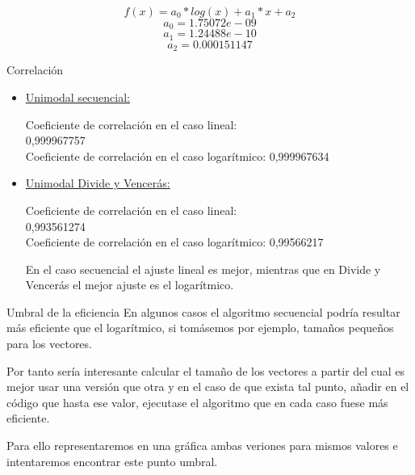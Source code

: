 \documentclass[12pt]{beamer}
\begin{document}
\begin{frame}
\[
f(x)=a_0*log(x)+a_1*x+a_2
\]
\[
a_0=1.75072e-09
\]
\[
a_1=1.24488e-10
\]
\[
a_2=0.000151147 
\]
\end{frame}

\begin{frame}{Correlación}
\begin{itemize}
\item \underline{Unimodal secuencial:}

	Coeficiente de correlación en el caso lineal: \\
	0,999967757\\
	Coeficiente de correlación en el caso logarítmico: 
	0,999967634
	
\vspace{3mm} %

\item \underline{Unimodal Divide y Vencerás:}

	Coeficiente de correlación en el caso lineal: \\
	0,993561274\\
	Coeficiente de correlación en el caso logarítmico: 
	0,99566217
	
\vspace{5mm} %

En el caso secuencial el ajuste lineal es mejor, mientras que en Divide y Vencerás el mejor ajuste es el logarítmico. 
\end{itemize}
\end{frame}

\begin{frame}{Umbral de la eficiencia}
En algunos casos el algoritmo secuencial podría resultar más eficiente que el logarítmico, si tomásemos por ejemplo, tamaños pequeños para los vectores.

\vspace{5mm} %

Por tanto sería interesante calcular el tamaño de los vectores a partir del cual es mejor usar una versión que otra y en el caso de que exista tal punto, añadir en el código que hasta ese valor, ejecutase el algoritmo que en cada caso fuese más eficiente.

\vspace{5mm} %

Para ello representaremos en una gráfica ambas veriones para mismos valores e intentaremos encontrar este punto umbral.
 
\end{frame}
\end{document}
